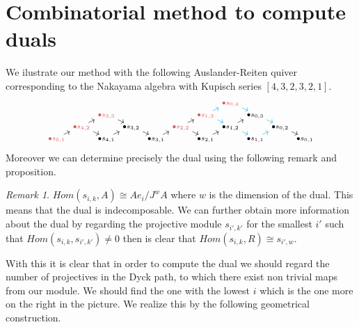 \documentclass[12pt, a4paper]{article}
\numberwithin{equation}{section}
\theoremstyle{definition}
\theoremstyle{plain}
\theoremstyle{remark}
\newtheorem{remark}[definition]{Remark}
\begin{document}
\section{Combinatorial method to compute duals}
We ilustrate our method with the following Auslander-Reiten quiver corresponding to the Nakayama algebra with Kupisch series $[4,3,2,3,2,1].$
\[
\scriptsize %
\begin{tikzcd}[scale=0.5, column sep=2pt, row sep=2pt] %
  &&&&&&& \textcolor[rgb]{0.839,0.361,0.361}{{\bullet{s_{0,4}}}} \\
  && \textcolor[rgb]{0.839,0.361,0.361}{{\bullet {s_{3,3}}}} &&&& \textcolor[rgb]{0.839,0.361,0.361}{{\bullet{s_{1,3}}}} && {\bullet{s_{0,3}}} \\
  & \textcolor[rgb]{0.839,0.361,0.361}{{\bullet{s_{4,2}}}} && {\bullet{s_{3,2}}} && \textcolor[rgb]{0.839,0.361,0.361}{{\bullet{s_{2,2}}}} && {\bullet{s_{1,2}}} && {\bullet{s_{0,2}}} \\
  \textcolor[rgb]{0.839,0.361,0.361}{{\bullet{s_{5,1}}}} && {\bullet{s_{4,1}}} && {\bullet{s_{3,1}}} && {\bullet{s_{2,1}}} && {\bullet{s_{1,1}}} && {\bullet{s_{0,1}}}
  \arrow[color=cyan, from=1-8, to=2-9]
  \arrow[from=2-3, to=3-4]
  \arrow[color=cyan, from=2-7, to=1-8]
  \arrow[color=cyan, from=2-7, to=3-8]
  \arrow[color=cyan, from=2-9, to=3-10]
  \arrow[from=3-2, to=2-3]
  \arrow[from=3-2, to=4-3]
  \arrow[from=3-4, to=4-5]
  \arrow[from=3-6, to=2-7]
  \arrow[from=3-6, to=4-7]
  \arrow[from=3-8, to=2-9]
  \arrow[color=cyan, from=3-8, to=4-9]
  \arrow[from=3-10, to=4-11]
  \arrow[from=4-1, to=3-2]
  \arrow[from=4-3, to=3-4]
  \arrow[from=4-5, to=3-6]
  \arrow[from=4-7, to=3-8]
  \arrow[color=cyan, from=4-9, to=3-10]
\end{tikzcd}
\]
Moreover we can determine precisely the dual using the following remark and proposition.
\begin{remark}
    $Hom(s_{i,k},A)\cong Ae_i/J^wA$ where $w$ is the dimension of the dual. This means that the dual is indecomposable. We can further obtain more information about the dual by regarding the projective module $s_{i',k'}$ for the smallest $i'$ such that $Hom(s_{i,k},s_{i',k'})\neq 0$ then is clear that $Hom(s_{i,k},R)\cong s_{i',w}.$ 
\end{remark}
With this it is clear that in order to compute the dual we should regard the number of projectives in the Dyck path, to which there exist non trivial maps from our module. We should find the one with the lowest $i$ which is the one more on the right in the picture. We realize this by the following geometrical construction. 
\end{document}
